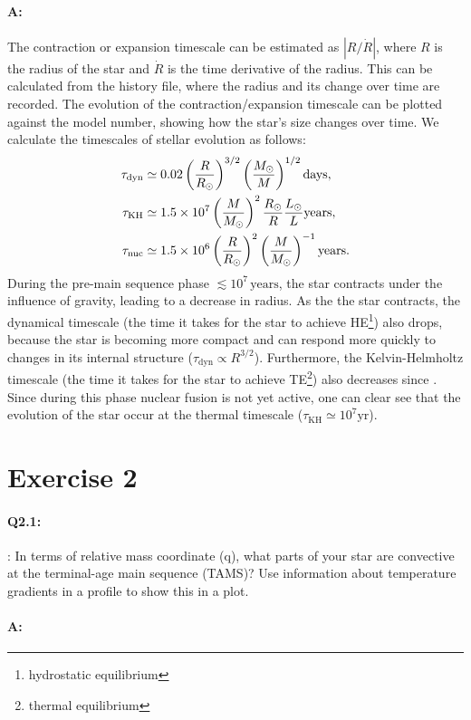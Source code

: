 \documentclass[twocolumn,fontsize=11pt]{scrartcl}
\begin{document}
\paragraph{A:} The contraction or expansion timescale can be estimated as \(\left|R/\dot{R}\right|\), where \(R\) is the radius of the star and \(\dot{R}\) is the time derivative of the radius. This can be calculated from the history file, where the radius and its change over time are recorded. The evolution of the contraction/expansion timescale can be plotted against the model number, showing how the star's size changes over time. We calculate the timescales of stellar evolution as follows:
\begin{align*}
    \tau_{\text{dyn}} &\simeq 0.02 \left(\frac{R}{R_\odot}\right)^{3/2} \left(\frac{M_\odot}{M}\right)^{1/2} \text{days}, \\
    \tau_{\text{KH}} &\simeq 1.5 \times 10^7\left(\frac{M}{M_\odot}\right)^{2} \frac{R_\odot}{R}\frac{L_\odot}{L} \text{years}, \\
    \tau_{\text{nuc}} &\simeq 1.5 \times 10^6\left(\frac{R}{R_\odot}\right)^{2} \left(\frac{M}{M_\odot}\right)^{-1} \text{years}.
\end{align*}
During the pre-main sequence phase \(\lesssim 10^7\,\text{years}\), the star contracts under the influence of gravity, leading to a decrease in radius. As the the star contracts, the dynamical timescale (the time it takes for the star to achieve HE\footnote{hydrostatic equilibrium}) also drops, because the star is becoming more compact and can respond more quickly to changes in its internal structure (\(\tau_{\text{dyn}} \propto R^{3/2}\)). Furthermore, the Kelvin-Helmholtz timescale (the time it takes for the star to achieve TE\footnote{thermal equilibrium}) also decreases since . Since during this phase nuclear fusion is not yet active, one can clear see that the evolution of the star occur at the thermal timescale (\(\tau_{\text{KH}} \simeq 10^7 \text{yr}\)).

\section{Exercise 2}

\paragraph{Q2.1:} : In terms of relative mass coordinate (q), what parts of your star are convective at the
terminal-age main sequence (TAMS)? Use information about temperature gradients in
a profile to show this in a plot.

\paragraph{A:} 

\printbibliography
\end{document}
